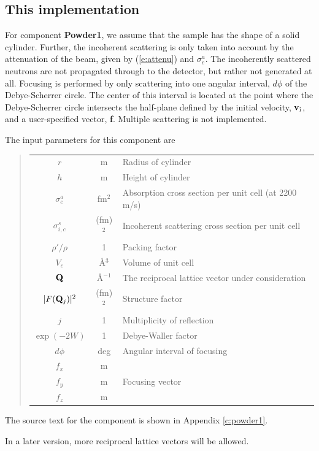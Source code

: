 \subsection{This implementation}
For component {\bf Powder1}, we assume that the sample
has the shape of a solid cylinder.
Further, the incoherent scattering is only taken into account
by the attenuation of the beam, given by (\ref{e:attenu})
and $\sigma_c^a$.
The incoherently scattered neutrons are not
propagated through to the detector, but rather not generated at all.
Focusing is performed by only scattering into one angular
interval, $d\phi$ of the Debye-Scherrer circle. The center of this
interval is located at the point where the Debye-Scherrer circle
intersects the half-plane defined by the initial velocity, ${\bf v}_{\rm i}$,
and a user-specified vector, {\bf f}.
Multiple scattering is not implemented.

The input parameters for this component are
%
\begin{quote}\begin{tabular}{ccl}
$r$ & m & Radius of cylinder \\
$h$ & m & Height of cylinder \\
$\sigma_c^a$ & fm$^2$ & Absorption cross section per unit cell (at 2200 m/s) \\
$\sigma_{i,c}^s$ & (fm)$^2$ & Incoherent scattering cross section per unit cell \\
$\rho'/\rho$ & 1 & Packing factor \\
$V_c$ & \AA$^3$ & Volume of unit cell \\
${\bf Q}$ & \AA$^{-1}$ & The reciprocal lattice vector under consideration \\
$|F({\bf Q}_j)|^2$ & (fm)$^2$ &
 Structure factor \\
$j$ & 1 & Multiplicity of reflection \\
$\exp(-2W)$ & 1 & Debye-Waller factor \\
$d\phi$ & deg & Angular interval of focusing \\
$f_x$ & m & \\
$f_y$ & m & Focusing vector\\
$f_z$ & m & \\
\end{tabular}\end{quote}
%
The source text for the component is shown in Appendix
\ref{c:powder1}.

In a later version, more reciprocal lattice vectors will be
allowed.

